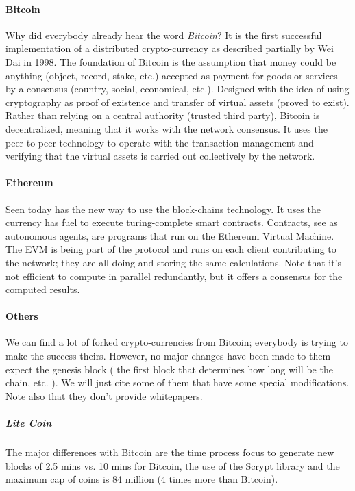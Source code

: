 \paragraph{Bitcoin \cite{SatoshiNakamoto2008Bitcoin:System}}
Why did everybody already hear the word \textit{Bitcoin}? It is the first successful implementation of a distributed crypto-currency as described partially by Wei Dai in 1998\cite{Wei1998B-Money}. The foundation of Bitcoin is the assumption that money could be anything (object, record, stake, etc.) accepted as payment for goods or services by a consensus (country, social, economical, etc.).
Designed with the idea of using cryptography as proof of existence and transfer of virtual assets (proved to exist). Rather than relying on a central authority (trusted third party), Bitcoin is decentralized, meaning that it works with the network consensus. It uses the peer-to-peer technology to operate with the transaction management and verifying that the virtual assets is carried out collectively by the network.

\paragraph{Ethereum \cite{Ethereum2016EthereumDocumentation}}
Seen today has the new way to use the block-chains technology. It uses the currency has fuel to execute turing-complete smart contracts. Contracts, see as autonomous agents, are programs that run on the Ethereum Virtual Machine. The EVM is being part of the protocol and runs on each client contributing to the network; they are all doing and storing the same calculations. Note that it's not efficient to compute in parallel redundantly, but it offers a consensus for the computed results. 

\paragraph{Others}
We can find a lot of forked crypto-currencies from Bitcoin; everybody is trying to make the success theirs. However, no major changes have been made to them expect the genesis block ( the first block that determines how long will be the chain, etc. ). We will just cite some of them that have some special modifications. Note also that they don't provide whitepapers.

\subparagraph{Lite Coin\cite{Litecoin2011LitecoinWiki}}
The major differences with Bitcoin are the time process focus to generate new blocks of 2.5 mins vs. 10 mins for Bitcoin, the use of the Scrypt\cite{COLINPERCIVAL2012STRONGERFUNCTIONS} library and the maximum cap of coins is 84 million (4 times more than Bitcoin).

